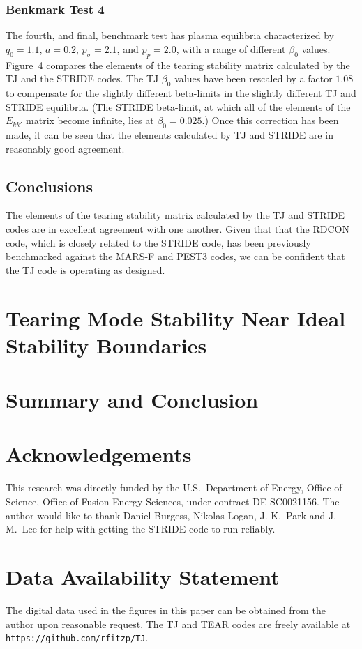 \documentclass[12pt,prb,aps]{revtex4-1}
\begin{document}
\subsubsection{Benkmark Test 4}
The fourth, and final,  benchmark test has plasma equilibria characterized by $q_0=1.1$, $a=0.2$, $p_\sigma = 2.1$, and $p_p=2.0$, with a range of different $\beta_0$ values.  
Figure~4 compares the elements of the tearing stability matrix calculated by the TJ and the STRIDE codes. The TJ $\beta_0$ values have been rescaled
by a factor $1.08$ to compensate for the slightly different beta-limits in the slightly different TJ and STRIDE equilibria. (The STRIDE beta-limit, at which all of the
elements of the $E_{kk'}$ matrix become infinite,  lies at
$\beta_0=0.025$.)
 Once this correction has been made, it can be seen that the elements calculated by
TJ and STRIDE are in reasonably good agreement.  

\subsection{Conclusions}
The elements of the tearing stability matrix calculated by the TJ and STRIDE codes are in excellent agreement with one another. Given that that the RDCON code,
which is closely related to the STRIDE code, has been previously benchmarked against the MARS-F and PEST3 codes,\cite{am2,aglas2} we can be confident  that the TJ code is operating as designed. 

\section{Tearing Mode Stability Near Ideal Stability Boundaries}\label{invest}

\section{Summary and Conclusion}\label{conc}

\section*{Acknowledgements}
This research was directly funded by the U.S.\ Department of Energy, Office of Science, Office of Fusion Energy Sciences, under  contract DE-SC0021156. 
The author would like to thank Daniel Burgess, Nikolas Logan, J.-K.~Park and J.-M.~Lee for help with getting the STRIDE code to
run reliably. 

\section*{Data Availability Statement}
The digital data used in the figures in this paper can be obtained from the author upon reasonable request. The TJ and TEAR codes are freely 
available at {\tt https://github.com/rfitzp/TJ}. 
\end{document}
